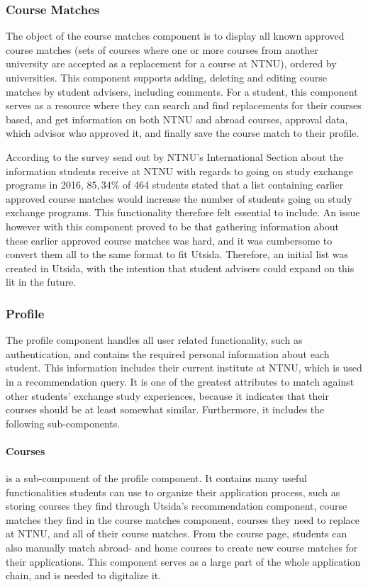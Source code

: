 \subsubsection{Course Matches}
The object of the course matches component is to display all known approved course matches (sets of courses where one or more courses from another university are accepted as a replacement for a course at NTNU), ordered by universities. This component supports adding, deleting and editing course matches by student advisers, including comments. For a student, this component serves as a resource where they can search and find replacements for their courses based, and get information on both NTNU and abroad courses, approval data, which advisor who approved it, and finally save the course match to their profile. 

According to the survey send out by NTNU's International Section about the information students receive at NTNU with regards to going on study exchange programs in 2016, $85,34\%$ of 464 students stated that a list containing earlier approved course matches would increase the number of students going on study exchange programs. This functionality therefore felt essential to include. An issue however with this component proved to be that gathering information about these earlier approved course matches was hard, and it was cumbersome to convert them all to the same format to fit Utsida. Therefore, an initial list was created in Utsida, with the intention that student advisers could expand on this lit in the future.

\subsubsection{Profile}
The profile component handles all user related functionality, such as authentication, and contains the required personal information about each student. This information includes their current institute at NTNU, which is used in a recommendation query. It is one of the greatest attributes to match against other students' exchange study experiences, because it indicates that their courses should be at least somewhat similar. Furthermore, it includes the following sub-components.

\paragraph{Courses} is a sub-component of the profile component. It contains many useful functionalities students can use to organize their application process, such as storing courses they find through Utsida's recommendation component, course matches they find in the course matches component, courses they need to replace at NTNU, and all of their course matches. From the course page, students can also manually match abroad- and home courses to create new course matches for their applications. This component serves as a large part of the whole application chain, and is needed to digitalize it. 

